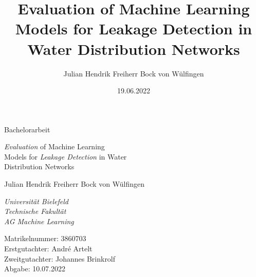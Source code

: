 \documentclass[twoside]{report}
\title{
    Evaluation of Machine Learning Models for Leakage Detection in Water Distribution Networks
}
\author{Julian Hendrik Freiherr Bock von Wülfingen}
\date{19.06.2022}
\begin{document}
\onehalfspacing

\begin{titlepage} %

	\begin{center}

        \vspace*{\baselineskip}

        {\Large Bachelorarbeit}
        
        \vspace{1.75\baselineskip}
        
        {\LARGE {\em Evaluation} of Machine Learning \\ Models for {\em Leakage Detection} in Water \\ Distribution Networks\par} %
    
        \vspace{5\baselineskip}
        
        {\Large Julian Hendrik Freiherr Bock von Wülfingen}
        
        \vspace{2\baselineskip}
        
        \textit{Universität Bielefeld \\ Technische Fakultät \\ AG Machine Learning}

    \end{center}
	
	\vfill %

	\vspace{0.3\baselineskip} %
	
	Matrikelnummer:	  3860703\\
    Erstgutachter:	  André Artelt\\
    Zweitgutachter:	  Johannes Brinkrolf\\
    Abgabe:		    10.07.2022

\end{titlepage}

\tableofcontents












\end{document}
